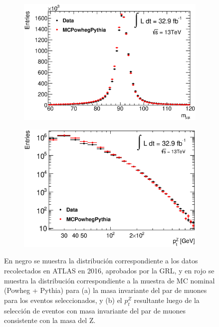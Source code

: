\begin{figure}[ht]
    \centering
    \begin{subfigure}[b]{0.495\textwidth}
        \centering
        \includegraphics[width=\textwidth]{images/Final_Zmass}
        \caption{}
        \label{fig:Zmass}
    \end{subfigure}
    \hfill
    \begin{subfigure}[b]{0.495\textwidth}
        \centering
        \includegraphics[width=\textwidth]{images/Final_Zpt}
        \caption{}
        \label{fig:Zpt}
    \end{subfigure}
    \caption{ En negro se muestra la distribución correspondiente a los datos recolectados en ATLAS en 2016, aprobados por la GRL, y en rojo se muestra la distribución correspondiente a la muestra de MC nominal (Powheg + Pythia) para (a) la masa invariante del par de muones para los eventos seleccionados, y (b) el $p_t^Z$ resultante luego de la selección de eventos con masa invariante del par de muones consistente con la masa del Z.} 
    \label{fig:Z}
\end{figure}

